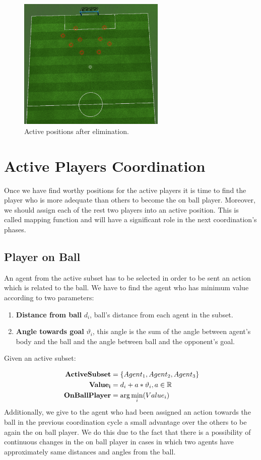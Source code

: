 \begin{figure}[t!]
\centering
  \includegraphics[width=7cm]{Chapter4/figures/Active3.png}
  \caption{Active positions after elimination.} 
  \label{fig:ActivePositions3}
\end{figure}


\section{Active Players Coordination}
Once we have find worthy positions for the active players it is time to find the player who is more adequate than others to become the on ball player. Moreover, we should assign each of the rest two players into an active position. This is called mapping function and will have a significant role in the next coordination's phases. 
\subsection{Player on Ball}
An agent from the active subset has to be selected in order to be sent an action which is related to the ball. We have to find the agent who has minimum value according to two parameters:
\begin{enumerate}
\item \textbf{Distance from ball} $d_{i}$, ball's distance from each agent in the subset. 
\item \textbf{Angle towards goal} $\vartheta_{i}$, this angle is the sum of  the angle between agent's body and the ball and the angle between ball and the opponent's goal.
\end{enumerate}
Given an active subset:

\begin{align*}\
{\bf ActiveSubset} &= \lbrace Agent_{1},Agent_{2},Agent_{3} \rbrace  \\
{\bf Value_{i}} &= d_{i} + a \ast \vartheta_{i}, a\in\mathbb{R} \\
{\bf OnBallPlayer} &= \arg\min_{i}(Value_{i})
\end{align*}
Additionally, we give to the agent who had been assigned an action towards the ball in the previous coordination cycle a small advantage over the others to be again the on ball player. We do this due to the fact that there is a possibility of continuous changes in the on ball player in cases in which two agents have approximately same distances and angles from the ball.



